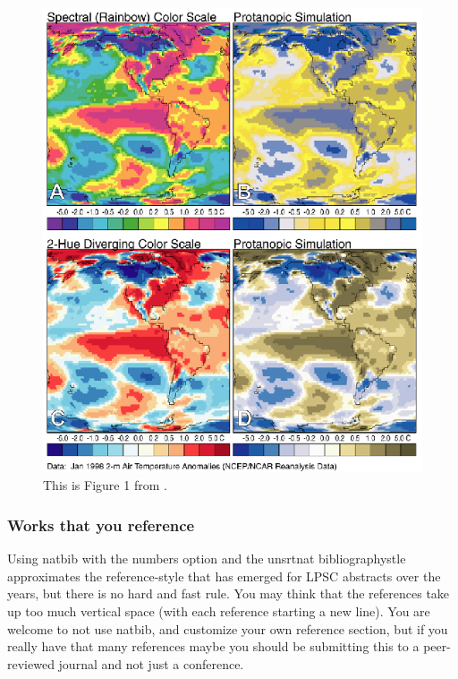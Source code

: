 \documentclass[twoside]{article}
\begin{document}
\begin{figure}
\begin{center}
\includegraphics[width=\columnwidth]{lb_fig1.eps}
\caption[Color Scales and Color-Deficient-Viewer Simulations]{
    \label{color_scales}
    This is Figure 1 from \citet{2004EOSTr..85..385L}.  
    }
\end{center}
\end{figure}

\subsubsection*{Works that you reference}

Using natbib with the numbers option and the unsrtnat bibliographystle
approximates the reference-style that has emerged for LPSC abstracts
over the years, but there is no hard and fast rule.  You may think that
the references take up too much vertical space (with each reference 
starting a new line).  You are welcome to not use natbib, and customize
your own reference section, but if you really have that many references
maybe you should be submitting this to a peer-reviewed journal and not
just a conference.



\end{document}
